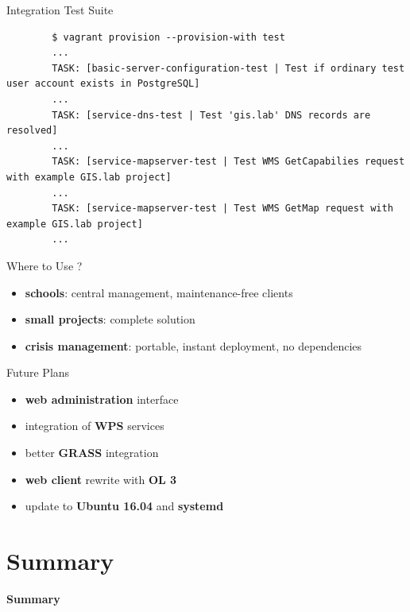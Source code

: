 \documentclass[12pt]{beamer}
\begin{document}
\begin{frame}[fragile]{Integration Test Suite}
	\lstset{language=sh}
	\begin{lstlisting}
		$ vagrant provision --provision-with test
		...
		TASK: [basic-server-configuration-test | Test if ordinary test user account exists in PostgreSQL]
		...
		TASK: [service-dns-test | Test 'gis.lab' DNS records are resolved]
		...
		TASK: [service-mapserver-test | Test WMS GetCapabilies request with example GIS.lab project]
		...
		TASK: [service-mapserver-test | Test WMS GetMap request with example GIS.lab project]
		...
	\end{lstlisting}
\end{frame}

\begin{frame}{Where to Use ?}
	\begin{itemize}
		\item \textbf{schools}: central management, maintenance-free clients
		\item \textbf{small projects}: complete solution
		\item \textbf{crisis management}: portable, instant deployment, no dependencies
	\end{itemize}
\end{frame}

\begin{frame}{Future Plans}
	\begin{itemize}
		\item \textbf{web administration} interface
		\item integration of \textbf{WPS} services
		\item better \textbf{GRASS} integration
		\item \textbf{web client} rewrite with \textbf{OL 3}
		\item update to \textbf{Ubuntu 16.04} and \textbf{systemd}
	\end{itemize}
\end{frame}


\section{Summary}
\begin{frame}
	\begin{center}
		\LARGE\textbf{Summary}
	\end{center}
\end{frame}
\end{document}

